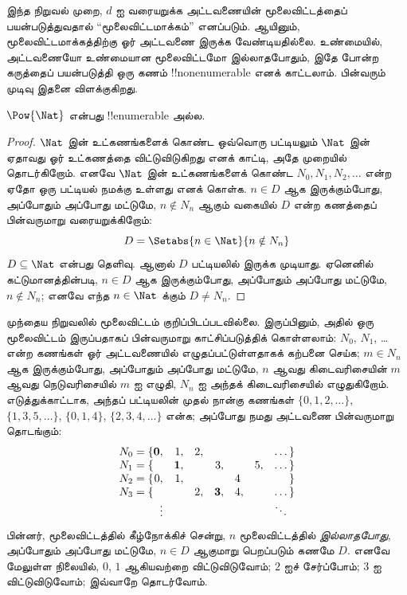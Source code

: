 \documentclass[../../../include/open-logic-section]{subfiles}
\begin{document}
\begin{explain}
இந்த நிறுவல் முறை, $d$ ஐ வரையறுக்க அட்டவணையின் மூலைவிட்டத்தைப்
பயன்படுத்துவதால் ``மூலைவிட்டமாக்கம்'' எனப்படும்.
ஆயினும், மூலைவிட்டமாக்கத்திற்கு ஓர் அட்டவணை இருக்க வேண்டியதில்லை.
உண்மையில், அட்டவணையோ உண்மையான மூலைவிட்டமோ இல்லாதபோதும்,
இதே போன்ற கருத்தைப் பயன்படுத்தி ஒரு கணம் !!{nonenumerable}
எனக் காட்டலாம். பின்வரும் முடிவு இதனை விளக்குகிறது.
\end{explain}

\begin{thm}
$\Pow{\Nat}$ என்பது !!{enumerable} அல்ல.
\end{thm}

\begin{proof}
$\Nat$ இன் உட்கணங்களைக் கொண்ட ஒவ்வொரு பட்டியலும்
$\Nat$ இன் ஏதாவது ஓர் உட்கணத்தை விட்டுவிடுகிறது எனக் காட்டி,
அதே முறையில் தொடர்கிறோம்.
எனவே $\Nat$ இன் உட்கணங்களைக் கொண்ட
$N_0, N_1, N_2, \ldots$ என்ற ஏதோ ஒரு பட்டியல் நமக்கு உள்ளது எனக் கொள்க.
$n \in D$ ஆக இருக்கும்போது, அப்போதும் அப்போது மட்டுமே,
$n \notin N_{n}$ ஆகும் வகையில் $D$ என்ற கணத்தைப் பின்வருமாறு
வரையறுக்கிறோம்:
\[
D = \Setabs{n \in \Nat}{n \notin N_n}
\]
$D\subseteq \Nat$ என்பது தெளிவு.
ஆனால் $D$ பட்டியலில் இருக்க முடியாது.
ஏனெனில் கட்டுமானத்தின்படி, $n \in D$ ஆக இருக்கும்போது,
அப்போதும் அப்போது மட்டுமே, $n\notin N_n$;
எனவே எந்த $n \in \Nat$ க்கும் $D \neq N_n$.
\end{proof}

\begin{explain}
முந்தைய நிறுவலில் மூலைவிட்டம் குறிப்பிடப்படவில்லை.
இருப்பினும், அதில் ஒரு மூலைவிட்டம் இருப்பதாகப் பின்வருமாறு
காட்சிப்படுத்திக் கொள்ளலாம்:
$N_0$, $N_1$, \dots என்ற கணங்கள் ஓர் அட்டவணையில் எழுதப்பட்டுள்ளதாகக்
கற்பனை செய்க; $m \in N_n$ ஆக இருக்கும்போது, அப்போதும் அப்போது மட்டுமே,
$n$ ஆவது கிடைவரிசையின் $m$ ஆவது நெடுவரிசையில் $m$ ஐ எழுதி,
$N_n$ ஐ அந்தக் கிடைவரிசையில் எழுதுகிறோம்.
எடுத்துக்காட்டாக, அந்தப் பட்டியலின் முதல் நான்கு கணங்கள்
$\{0,1,2,\dots\}$, $\{1, 3, 5, \dots\}$, $\{0,1,4\}$,
$\{2,3,4,\dots\}$ என்க; அப்போது நமது அட்டவணை பின்வருமாறு தொடங்கும்:
\[
\begin{array}{r@{}rrrrrrr}
  N_0 = \{ & \mathbf{0}, & 1, & 2, & & & & \dots\}\\
  N_1 = \{ &  & \mathbf{1}, &  & 3, &  & 5, & \dots\}\\
  N_2 = \{ & 0, & 1, &  &  & 4\phantom{,} &  & \}\\
  N_3 = \{ &  &  & 2, & \mathbf{3}, & 4, & & \dots\}\\
  &\vdots & & & & & & \ddots\phantom{\}}
  \end{array}
\]
பின்னர், மூலைவிட்டத்தில் கீழ்நோக்கிச் சென்று,
$n$ மூலைவிட்டத்தில் \emph{இல்லாதபோது}, அப்போதும் அப்போது மட்டுமே,
$n \in D$ ஆகுமாறு பெறப்படும் கணமே $D$.
எனவே மேலுள்ள நிலையில், $0$, $1$ ஆகியவற்றை விட்டுவிடுவோம்;
$2$ ஐச் சேர்ப்போம்; $3$ ஐ விட்டுவிடுவோம்; இவ்வாறே தொடர்வோம்.
\end{explain}
\end{document}
